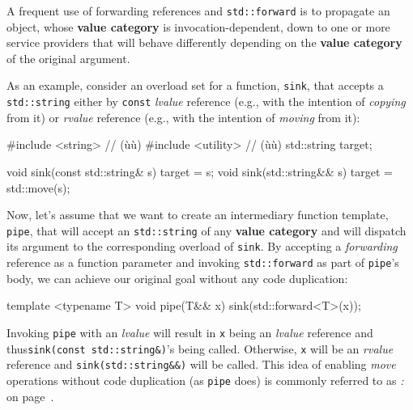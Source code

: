A frequent use of forwarding references and \texttt{std::forward} is to
propagate an object, whose \textbf{value category} is
invocation-dependent, down to one or more service providers that will
behave differently depending on the \textbf{value category} of the
original argument.

As an example, consider an overload set for a function, \texttt{sink},
that accepts a \texttt{std::string} either by \texttt{const}
\emph{lvalue} reference (e.g., with the intention of \textit{copying} from it) or
\emph{rvalue} reference (e.g., with the intention of \textit{moving} from it):

\begin{emcppshiddenlisting}[emcppsbatch=e8]
#include <string>   // (ù{}ù)
#include <utility>  // (ù{}ù)
std::string target;
\end{emcppshiddenlisting}
\begin{emcppslisting}[emcppsbatch=e8]
void sink(const std::string& s) { target = s; }
void sink(std::string&& s)      { target = std::move(s); }
\end{emcppslisting}

\noindent Now, let's assume that we want to create an intermediary function
template, \texttt{pipe}, that will accept an \texttt{std::string} of any
\textbf{value category} and will dispatch its argument to the
corresponding overload of \texttt{sink}. By accepting a
\emph{forwarding} reference as a function parameter and invoking
\texttt{std::forward} as part of \texttt{pipe}'s body, we can achieve
our original goal without any code duplication:

\begin{emcppslisting}[emcppsbatch=e8]
template <typename T>
void pipe(T&& x)
{
    sink(std::forward<T>(x));
}
\end{emcppslisting}

\noindent Invoking \texttt{pipe} with an \emph{lvalue} will result in \texttt{x}
being an \emph{lvalue} reference and thus\linebreak[4]%
\mbox{\texttt{sink(const}~\texttt{std::string\&)}'s} being called. Otherwise,
\texttt{x} will be an \emph{rvalue} reference and
\texttt{sink(std::string\&\&)} will be called. This idea of enabling
\emph{move} operations without code duplication (as \texttt{pipe} does)
is commonly referred to as \textit{: } on page~\pageref{perfect-forwarding-for-generic-factory-functions}.

